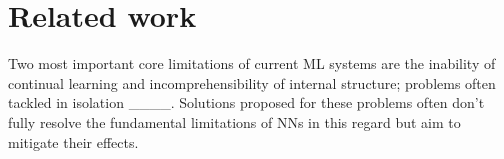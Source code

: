 \section{Related work}
\label{sec:related_work}


Two most important core limitations of current ML systems are the inability of continual learning and incomprehensibility of internal structure; problems often tackled in isolation ____. Solutions proposed for these problems often don't fully resolve the fundamental limitations of NNs in this regard but aim to mitigate their effects.


